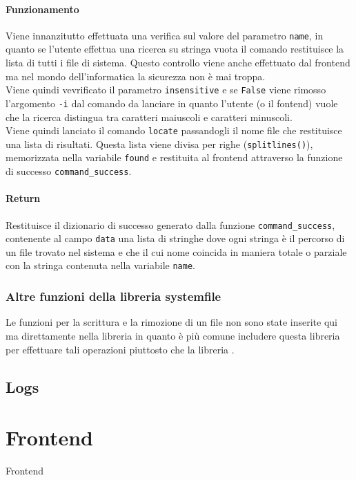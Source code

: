 \documentclass[11pt]{article}
\begin{document}
\paragraph{Funzionamento}
Viene innanzitutto effettuata una verifica sul valore del parametro \texttt{name}, in quanto se l'utente effettua
una ricerca su stringa vuota il comando restituisce la lista di tutti i file di sistema. Questo controllo viene
anche effettuato dal frontend ma nel mondo dell'informatica la sicurezza non è mai troppa.\\
Viene quindi vevrificato il parametro \texttt{insensitive} e se \texttt{False} viene rimosso l'argomento
\texttt{-i} dal comando da lanciare in quanto l'utente (o il fontend) vuole che la ricerca distingua tra
caratteri maiuscoli e caratteri minuscoli.\\
Viene quindi lanciato il comando \texttt{locate} passandogli il nome file che restituisce una lista di risultati.
Questa lista viene divisa per righe (\texttt{splitlines()}), memorizzata nella variabile \texttt{found} e restituita
al frontend attraverso la funzione di successo \texttt{command\_success}.
\paragraph{Return}
Restituisce il dizionario di successo generato dalla funzione \texttt{command\_success}, contenente al campo
\texttt{data} una lista di stringhe dove ogni stringa è il percorso di un file trovato nel sistema e che il cui
nome coincida in maniera totale o parziale con la stringa contenuta nella variabile \texttt{name}.

\subsubsection{Altre funzioni della libreria systemfile}\label{othersystemfilefunctions}
Le funzioni per la scrittura e la rimozione di un file non sono state inserite qui ma direttamente nella libreria
 in quanto è più comune includere questa libreria per effettuare tali operazioni piuttosto
che la libreria .


\subsection{Logs}\label{logs}

\section{Frontend}\label{frontend}
Frontend
\end{document}

